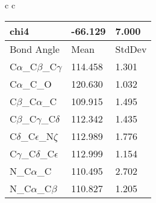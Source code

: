 \begin{longtable}{ c c }
\begin{tabular}{ l l l }
  chi4 & -66.129 & 7.000 \\ \midrule
  Bond Angle   & Mean     & StdDev \\ \midrule
  C$\alpha$\_C$\beta$\_C$\gamma$ & 114.458 & 1.301\\
  C$\alpha$\_C\_O & 120.630 & 1.032\\
  C$\beta$\_C$\alpha$\_C & 109.915 & 1.495\\
  C$\beta$\_C$\gamma$\_C$\delta$ & 112.342 & 1.435\\
  C$\delta$\_C$\epsilon$\_N$\zeta$ & 112.989 & 1.776\\
  C$\gamma$\_C$\delta$\_C$\epsilon$ & 112.999 & 1.154\\
  N\_C$\alpha$\_C & 110.495 & 2.702\\
  N\_C$\alpha$\_C$\beta$ & 110.827 & 1.205\\
  \bottomrule
  \end{tabular}
  \\
  
\end{longtable}    
